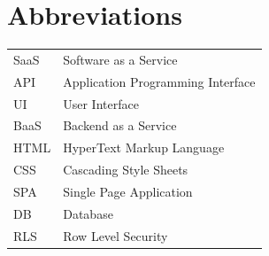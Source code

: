 \documentclass[12pt,a4paper]{report}     %
\begin{document}
\section*{Abbreviations}

\begin{tabular}{ll}
SaaS & Software as a Service \\
API  & Application Programming Interface \\
UI   & User Interface \\
BaaS & Backend as a Service \\
HTML & HyperText Markup Language \\
CSS  & Cascading Style Sheets \\
SPA  & Single Page Application \\
DB   & Database \\
RLS  & Row Level Security \\
\end{tabular} 	

\newpage

\thispagestyle{empty}
\fancyhead{}
\renewcommand{\headrulewidth}{0pt}

\tableofcontents
\newpage
\pagestyle{fancy}
\renewcommand{\headrulewidth}{0.5pt}
\renewcommand{\footrulewidth}{0.5pt}
\end{document}
